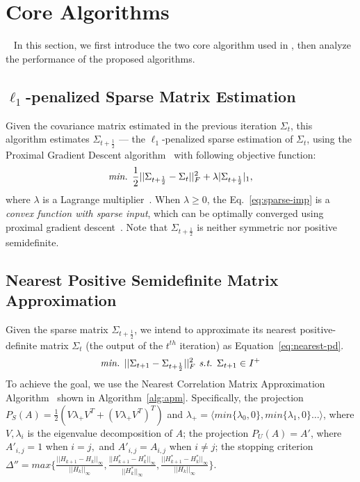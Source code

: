 \section{\TheName{} Core Algorithms}~\label{sec:4}
In this section, we first introduce the two core algorithm used in \TheName{}, then analyze the performance of the proposed algorithms.

\subsection{$\ell_1$-penalized Sparse Matrix Estimation}
Given the covariance matrix estimated in the previous iteration $\Sigma_{t}$, this algorithm estimates $\Sigma_{t+\frac{1}{2}}$ --- the $\ell_1$-penalized sparse estimation of $\Sigma_{t}$, using the Proximal Gradient Descent algorithm~\cite{nesterov2004introductory} with following objective function:   
\begin{equation}
\emph{min. }\frac{1}{2}||\Sigma_{t+\frac{1}{2}}-\Sigma_t||_F^2+\lambda |\Sigma_{t+\frac{1}{2}}|_1,
\label{eq:sparse-imp}
\end{equation}
where $\lambda$ is a Lagrange multiplier~\cite{wu2009karush}. 
When $\lambda\geq 0$, the Eq.~\ref{eq:sparse-imp} is a \emph{convex function with sparse input}, which can be optimally converged using proximal gradient descent~\cite{nesterov2004introductory}. 
Note that $\Sigma_{t+\frac{1}{2}}$ is neither symmetric nor positive semidefinite.



\subsection{Nearest Positive Semidefinite Matrix Approximation}
Given the sparse matrix $\Sigma_{t+\frac{1}{2}}$, we intend to approximate its nearest positive-definite matrix $\Sigma_{t}$ (the output of the $t^{th}$ iteration) as Equation~\ref{eq:nearest-pd}. 
%
\begin{equation}
\emph{min. } ||\Sigma_{t+1}-\Sigma_{t+\frac{1}{2}}||_F^2 \emph{ s.t. }\Sigma_{t+1}\in  {\bf }I^+
\label{eq:nearest-pd}
\end{equation}
%
To achieve the goal, we use the Nearest Correlation Matrix Approximation Algorithm~\cite{higham2002computing} shown in Algorithm~\ref{alg:apm}.
Specifically, the projection $P_S(A)=\frac{1}{2}(V\lambda_+V^T+(V\lambda_+V^T)^T)$ and  $\lambda_+=\langle min\{\lambda_0,0\},min\{\lambda_1,0\}\dots  \rangle$, where $V,\lambda_i$ is the eigenvalue decomposition of $A$; the projection $P_U(A)=A'$, where $A'_{i,j}=1$ when $i=j,$ and $A'_{i,j}=A_{i,j}$ when $i\neq j$; the stopping criterion $\Delta''=max\{\frac{||H_{k+1}-H_k||_\infty}{||H_k||_\infty}, \frac{||H_{k+1}^*-H_k^*||_\infty}{||H_k^*||_\infty}, \frac{||H_{k+1}^*-H_k^*||_\infty}{||H_k||_\infty}\}$.
 

